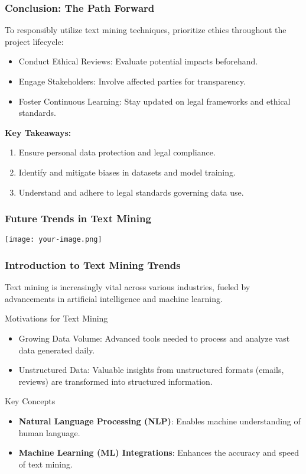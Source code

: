 \documentclass[aspectratio=169]{beamer}
\begin{document}
\begin{frame}[fragile]
    \frametitle{Conclusion: The Path Forward}

    To responsibly utilize text mining techniques, prioritize ethics throughout the project lifecycle:

    \begin{itemize}
        \item Conduct Ethical Reviews: Evaluate potential impacts beforehand.
        \item Engage Stakeholders: Involve affected parties for transparency.
        \item Foster Continuous Learning: Stay updated on legal frameworks and ethical standards.
    \end{itemize}
    
    \textbf{Key Takeaways:}
    \begin{enumerate}
        \item Ensure personal data protection and legal compliance.
        \item Identify and mitigate biases in datasets and model training.
        \item Understand and adhere to legal standards governing data use.
    \end{enumerate}
\end{frame}

\begin{frame}[fragile]
    \frametitle{Future Trends in Text Mining}
    \texttt{[image: your-image.png]} %
\end{frame}

\begin{frame}[fragile]
    \frametitle{Introduction to Text Mining Trends}
    Text mining is increasingly vital across various industries, fueled by advancements in artificial intelligence and machine learning. 

    \begin{block}{Motivations for Text Mining}
        \begin{itemize}
            \item Growing Data Volume: Advanced tools needed to process and analyze vast data generated daily.
            \item Unstructured Data: Valuable insights from unstructured formats (emails, reviews) are transformed into structured information.
        \end{itemize}
    \end{block}
    
    \begin{block}{Key Concepts}
        \begin{itemize}
            \item \textbf{Natural Language Processing (NLP)}: Enables machine understanding of human language.
            \item \textbf{Machine Learning (ML) Integrations}: Enhances the accuracy and speed of text mining.
        \end{itemize}
    \end{block}
\end{frame}
\end{document}
